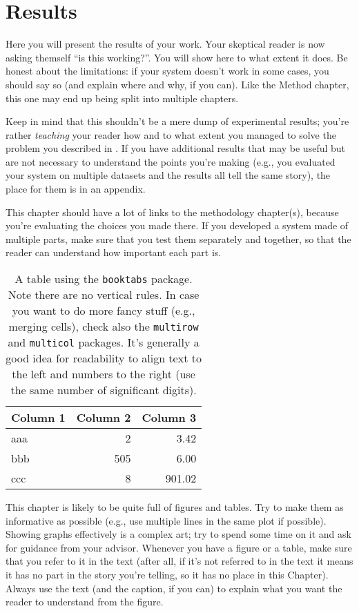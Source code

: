 \chapter{Results}
\label{ch:results}

Here you will present the results of your work. Your skeptical reader is now asking themself
``is this working?''. You will show here to what extent it does. Be honest about the limitations: if your system doesn't work in some cases, you should say so (and explain where and why, if you
can). Like the Method chapter, this one may end up being split into multiple chapters.

Keep in mind that this shouldn't be a mere dump of experimental results; you're rather
\emph{teaching} your reader how and to what extent you managed to solve the problem you
described in . If you have additional results that may be useful but are not necessary to understand the points you're making (e.g., you evaluated your system on multiple datasets and the results all tell the same story), the place for them is in an appendix.

This chapter should have a lot of links to the methodology chapter(s), because you're
evaluating the choices you made there. If you developed a system made of multiple parts,
make sure that you test them separately and together, so that the reader can understand how
important each part is.

\begin{table}
    \centering
    \begin{tabular}{lrr}
        \toprule
        \textbf{Column 1} & \textbf{Column 2} & \textbf{Column 3} \\
        \midrule
        aaa &   2 &   3.42 \\
        bbb & 505 &   6.00 \\
        ccc &   8 & 901.02 \\
        \bottomrule
    \end{tabular}
    \caption{A table using the \latex \texttt{booktabs} package. Note there are no vertical
    rules. In case you want to do more fancy stuff (e.g., merging cells), check also the
    \texttt{multirow} and \texttt{multicol} packages. It's generally a good idea for readability
    to align text to the left and numbers to the right (use the same number of significant digits).}
    \label{tab:table}
\end{table}

This chapter is likely to be quite full of figures and tables. Try to make them as informative
as possible (e.g., use multiple lines in the same plot if possible). Showing graphs
effectively is a complex art; try to spend some time on it and ask for guidance from your
advisor. Whenever you have a figure or a table, make sure that you refer to it in the text
(after all, if it's not referred to in the text it means it has no part in the story you're
telling, so it has no place in this Chapter). Always use the text (and the caption, if you can) to explain what you want the reader to understand from the figure.


